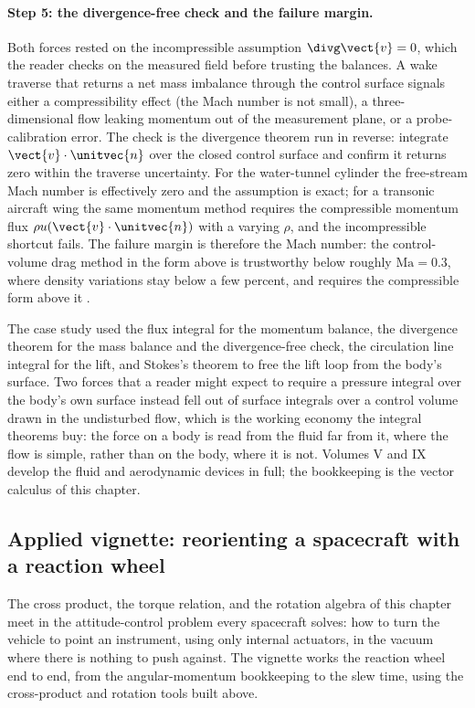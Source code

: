 \paragraph{Step 5: the divergence-free check and the failure margin.}
Both forces rested on the incompressible assumption $\divg\vect{v} =
0$, which the reader checks on the measured field before trusting the
balances. A wake traverse that returns a net mass imbalance through
the control surface signals either a compressibility effect (the Mach
number is not small), a three-dimensional flow leaking momentum out of
the measurement plane, or a probe-calibration error. The check is the
divergence theorem run in reverse: integrate $\vect{v}\cdot\unitvec{n}$
over the closed control surface and confirm it returns zero within the
traverse uncertainty. For the water-tunnel cylinder the free-stream
Mach number is effectively zero and the assumption is exact; for a
transonic aircraft wing the same momentum method requires the
compressible momentum flux $\rho u(\vect{v}\cdot\unitvec{n})$ with a
varying $\rho$, and the incompressible shortcut fails. The failure
margin is therefore the Mach number: the control-volume drag method in
the form above is trustworthy below roughly $\mathrm{Ma} = 0.3$, where
density variations stay below a few percent, and requires the
compressible form above it \cite{text:anderson-aerodynamics}.

The case study used the flux integral for the momentum balance, the
divergence theorem for the mass balance and the divergence-free check,
the circulation line integral for the lift, and Stokes's theorem to
free the lift loop from the body's surface. Two forces that a reader
might expect to require a pressure integral over the body's own
surface instead fell out of surface integrals over a control volume
drawn in the undisturbed flow, which is the working economy the
integral theorems buy: the force on a body is read from the fluid far
from it, where the flow is simple, rather than on the body, where it is
not. Volumes V and IX develop the fluid and aerodynamic devices in
full; the bookkeeping is the vector calculus of this chapter.

\subsection{Applied vignette: reorienting a spacecraft with a reaction
wheel}

The cross product, the torque relation, and the rotation algebra of
this chapter meet in the attitude-control problem every spacecraft
solves: how to turn the vehicle to point an instrument, using only
internal actuators, in the vacuum where there is nothing to push
against. The vignette works the reaction wheel end to end, from the
angular-momentum bookkeeping to the slew time, using the cross-product
and rotation tools built above.


